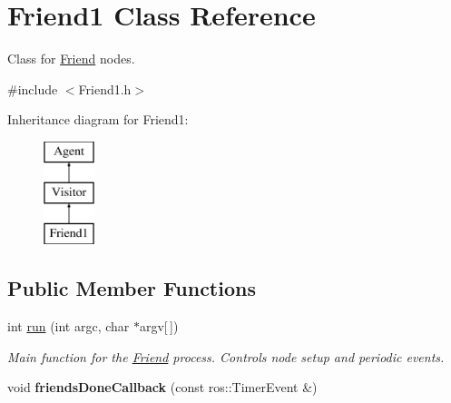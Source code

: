 \hypertarget{classFriend1}{\section{Friend1 Class Reference}
\label{classFriend1}
}


Class for \hyperlink{classFriend}{Friend} nodes.  




{\ttfamily \#include $<$Friend1.\-h$>$}

Inheritance diagram for Friend1\-:\begin{figure}[H]
\begin{center}
\leavevmode
\includegraphics[height=3.000000cm]{classFriend1}
\end{center}
\end{figure}
\subsection*{Public Member Functions}
\begin{DoxyCompactItemize}
\item 
\hypertarget{classFriend1_af76fdf88c44de0410ad51c9290e88a4e}{int \hyperlink{classFriend1_af76fdf88c44de0410ad51c9290e88a4e}{run} (int argc, char $\ast$argv\mbox{[}$\,$\mbox{]})}\label{classFriend1_af76fdf88c44de0410ad51c9290e88a4e}

\begin{DoxyCompactList}\small\item\em Main function for the \hyperlink{classFriend}{Friend} process. Controls node setup and periodic events. \end{DoxyCompactList}\item 
\hypertarget{classFriend1_a18a2d1c5a80fd0b2c13bc4001fae540b}{void {\bfseries friends\-Done\-Callback} (const ros\-::\-Timer\-Event \&)}\label{classFriend1_a18a2d1c5a80fd0b2c13bc4001fae540b}

\end{DoxyCompactItemize}
